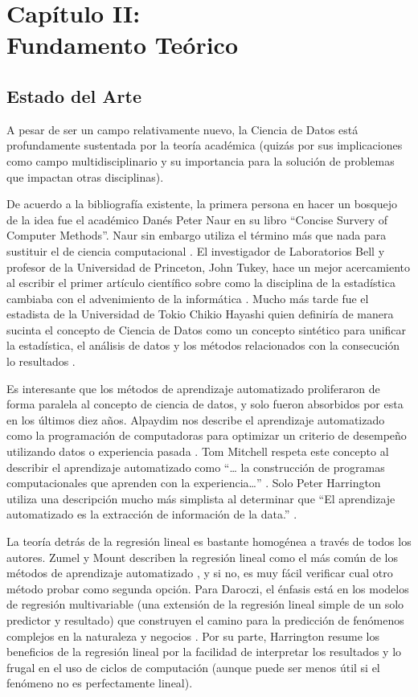 \setcounter{chapter}{1}
\chapter{Capítulo II: \\Fundamento Teórico}
\thispagestyle{empty}

\section{Estado del Arte}
A pesar de ser un campo relativamente nuevo, la Ciencia de Datos está profundamente sustentada por la teoría académica (quizás por sus implicaciones como campo multidisciplinario y su importancia para la solución de problemas que impactan otras disciplinas).

De acuerdo a la bibliografía existente, la primera persona en hacer un bosquejo de la idea fue el académico Danés Peter Naur en su libro “Concise Survery of Computer Methods”. Naur sin embargo utiliza el término más que nada para sustituir el de ciencia computacional \cite{naur}. El investigador de Laboratorios Bell y profesor de la Universidad de Princeton, John Tukey, hace un mejor acercamiento al escribir el primer artículo científico sobre como la disciplina de la estadística cambiaba con el advenimiento de la informática \cite{tukey}. Mucho más tarde fue el estadista de la Universidad de Tokio Chikio Hayashi quien definiría de manera sucinta el concepto de Ciencia de Datos como un concepto sintético para unificar la estadística, el análisis de datos y los métodos relacionados con la consecución lo resultados \cite{hayashi}.

Es interesante que los métodos de aprendizaje automatizado proliferaron de forma paralela al concepto de ciencia de datos, y solo fueron absorbidos por esta en los últimos diez años. Alpaydim nos describe el aprendizaje automatizado como la programación de computadoras para optimizar un criterio de desempeño utilizando datos o experiencia pasada \cite{alpaydin}. Tom Mitchell respeta este concepto al describir el aprendizaje automatizado como “… la construcción de programas computacionales que aprenden con la experiencia…” \cite[pag. XV]{mitchell}. Solo Peter Harrington utiliza una descripción mucho más simplista al determinar que “El aprendizaje automatizado es la extracción de información de la data.” \cite[pag. 5]{harrington}.

La teoría detrás de la regresión lineal es bastante homogénea a través de todos los autores. Zumel y Mount describen la regresión lineal como el más común de los métodos de aprendizaje automatizado \cite{zumelMount}, y si no, es muy fácil verificar cual otro método probar como segunda opción. Para Daroczi, el énfasis está en los modelos de regresión multivariable (una extensión de la regresión lineal simple de un solo predictor y resultado) que construyen el camino para la predicción de fenómenos complejos en la naturaleza y negocios \cite{daroczi}. Por su parte, Harrington resume los beneficios de la regresión lineal \cite{harrington} por la facilidad de interpretar los resultados y lo frugal en el uso de ciclos de computación (aunque puede ser menos útil si el fenómeno no es perfectamente lineal).
 
